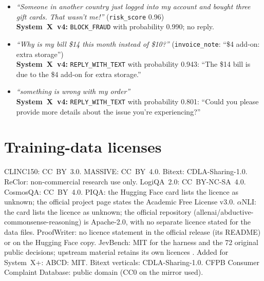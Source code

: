\documentclass[11pt]{article}
\newcommand{\reply}{\texttt{REPLY\_WITH\_TEXT}}
\newcommand{\sysplus}{System~X+}
\newcommand{\sysfour}{System~X~v4}
\begin{document}
\begin{small}
\begin{itemize}
\item \emph{``Someone in another country just logged into my account and bought three gift cards. That wasn't me!''} (\texttt{risk\_score} 0.96)\\
\textbf{\sysfour:} \texttt{BLOCK\_FRAUD} with probability 0.990; no reply.
\item \emph{``Why is my bill \$14 this month instead of \$10?''} (\texttt{invoice\_note}: ``\$4 add-on: extra storage'')\\
\textbf{\sysfour:} \reply{} with probability 0.943: ``The \$14 bill is due to the \$4 add-on for extra storage.''
\item \emph{``something is wrong with my order''}\\
\textbf{\sysfour:} \reply{} with probability 0.801: ``Could you please provide more details about the issue you're experiencing?''
\end{itemize}
\end{small}

\section{Training-data licenses}\label{app:licenses}
CLINC150: CC~BY~3.0. MASSIVE: CC~BY~4.0. Bitext: CDLA-Sharing-1.0. ReClor: non-commercial research use only. LogiQA~2.0: CC~BY-NC-SA~4.0. CosmosQA: CC~BY~4.0. PIQA: the Hugging Face card lists the licence as unknown; the official project page states the Academic Free License v3.0. $\alpha$NLI: the card lists the licence as unknown; the official repository (allenai/abductive-commonsense-reasoning) is Apache-2.0, with no separate licence stated for the data files. ProofWriter: no licence statement in the official release (its README) or on the Hugging Face copy. JevBench: MIT for the harness and the 72 original public decisions; upstream material retains its own licences \citep{jevbench2026}. Added for \sysplus{}: ABCD: MIT. Bitext verticals: CDLA-Sharing-1.0. CFPB Consumer Complaint Database: public domain (CC0 on the mirror used).
\end{document}
